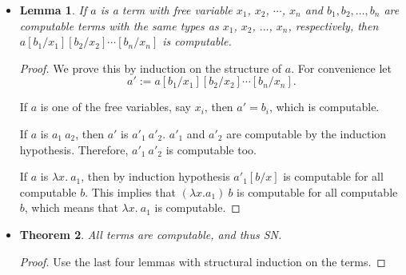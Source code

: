 \documentclass[10pt]{article}
\newtheorem{lemma}{Lemma}[section]
\newtheorem{theorem}[lemma]{Theorem}
\begin{document}
\begin{itemize}
\begin{proof}
        If $c$ reduces to $0$, then we have that
        $$R\ a\ b\ c\ a_1\ a_2\ \dotsb\ a_n \rightarrow_* R\ a'\ b'\ 0\ a_1'\ a_2'\ \dotsb\ a_n' \rightarrow_1 a'\ a'_1\ a'_2\ \dotsb\ a'_n.$$
        For some $a', b', a_1', a_2', \dotsc a'_n$ that $a, b, a_1, a_2, \dotsc, a_n$ reduce to, respectively.
        Since $a\ a_1\ a_2\ \dotsb\ a_n \rightarrow a'\ a_1'\ a_2'\ \dotsb\ a_n'$, it must
        be the case that $a'\ a_1'\ a_2'\ \dotsb\ a_n'$ is SN. Therefore, $R\ a\ b\ c\ a_1\ a_2\ \dotsb\ a_n$
        is SN as well.
        
        If $c$ reduces to $s(t)$, we have that $s(t)$ is computable, thus SN. This means
        that $t$ is SN, thus computable. It follows by induction hypothesis that $(R\ a'\ b'\ t)$
        is computable for any computable $a'$ and $b'$. Consider the reduction of
        $R\ a\ b\ c\ a_1\ a_2\ \dotsb\ a_n$, we have that it must be of the form
        $$R\ a\ b\ c\ a_1\ a_2\ \dotsb\ a_n 
        \rightarrow_* R\ a'\ b'\ s(t)\ a_1'\ a_2'\ \dotsb\ a_n'
        \rightarrow_1 b'\ t\ (R\ a'\ b'\ t)\ a_1'\ a_2'\ \dotsb\ a_n'.$$
        Since all the terms in the last expression is computable,
        we have that the term is SN. Therefore, 
        $R\ a\ b\ c\ a_1\ a_2\ \dotsb\ a_n$ is SN, that thus computable too.
      \end{proof}
      
      \item \begin{lemma}
        If $a$ is a term with free variable $x_1$, $x_2$, $\dotsb$, $x_n$
        and $b_1, b_2, \dotsc, b_n$ are computable terms with the same
        types as $x_1$, $x_2$, $\dotsc$, $x_n$, respectively, then
        $a[b_1/x_1][b_2/x_2]\dotsb[b_n/x_n]$ is computable.
      \end{lemma}
      
      \begin{proof}
        We prove this by induction on the structure of $a$.
        For convenience let $$a' := a[b_1/x_1][b_2/x_2]\dotsb[b_n/x_n].$$
        
        If $a$ is one of the free variables, say $x_i$, then $a' = b_i$,
        which is computable.
        
        If $a$ is $a_1\ a_2$, then $a'$ is $a'_1\ a'_2$.
        $a'_1$ and $a'_2$ are computable by the induction hypothesis.
        Therefore, $a'_1\ a'_2$ is computable too.
        
        If $a$ is $\lambda x.\ a_1$, then by induction hypothesis
        $a'_1[b/x]$ is computable for all computable $b$.
        This implies that $(\lambda x. a_1)\ b$ is computable
        for all computable $b$, which means that $\lambda x.\ a_1$
        is computable.
      \end{proof}
        
      
      \item \begin{theorem} 
        All terms are computable, and thus SN.
      \end{theorem}
      \begin{proof}
        Use the last four lemmas with structural induction on the terms.
      \end{proof}
    \end{itemize}      
\end{document}
